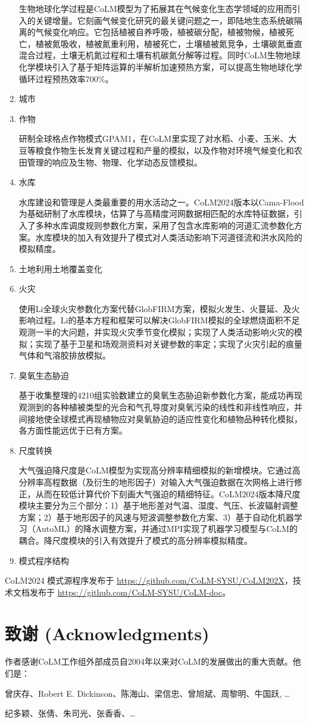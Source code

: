 \begin{enumerate}[label={\arabic*)}]
    生物地球化学过程是CoLM模型为了拓展其在气候变化生态学领域的应用而引入的关键增量。它刻画气候变化研究的最关键问题之一，即陆地生态系统碳隔离的气候变化响应。它包括植被自养呼吸，植被碳分配，植被物候，植被死亡，植被氮吸收，植被氮重利用，植被死亡，土壤植被氮竞争，土壤碳氮垂直混合过程，土壤无机氮过程和土壤有机碳氮分解等过程。同时CoLM生物地球化学模块引入了基于矩阵运算的半解析加速预热方案，可以提高生物地球化学循环过程预热效率700\%。

    \item 城市
    \item 作物 

    研制全球格点作物模式GPAM1，在CoLM里实现了对水稻、小麦、玉米、大豆等粮食作物生长发育关键过程和产量的模拟，以及作物对环境气候变化和农田管理的响应及生物、物理、化学动态反馈模拟。
    
    \item 水库

    水库建设和管理是人类最重要的用水活动之一。CoLM2024版本以Cama-Flood为基础研制了水库模块，估算了与高精度河网数据相匹配的水库特征数据，引入了多种水库调度规则参数化方案，采用了包含水库影响的河道汇流参数化方案。水库模块的加入有效提升了模式对人类活动影响下河道径流和洪水风险的模拟精度。
    
    \item 土地利用土地覆盖变化 
    \item 火灾

    使用Li全球火灾参数化方案代替GlobFIRM方案，模拟火发生、火蔓延、及火影响过程。Li的基本方程和框架可以解决GlobFIRM模拟的全球燃烧面积不足观测一半的大问题，并实现火灾季节变化模拟；实现了人类活动影响火灾的模拟；实现了基于卫星和场观测资料对关键参数的率定；实现了火灾引起的痕量气体和气溶胶排放模拟。

    \item 臭氧生态胁迫

    基于收集整理的4210组实验数建立的臭氧生态胁迫新参数化方案，能成功再现观测到的各种植被类型的光合和气孔导度对臭氧污染的线性和非线性响应，并间接地使全球模式再现植物应对臭氧胁迫的适应性变化和植物品种转化模拟，各方面性能远优于已有方案。
    
    \item 尺度转换

    大气强迫降尺度是CoLM模型为实现高分辨率精细模拟的新增模块。它通过高分辨率高程数据（及衍生的地形因子）对输入大气强迫数据在次网格上进行修正，从而在较低计算代价下刻画大气强迫的精细特征。CoLM2024版本降尺度模块主要分为三个部分：1）基于地形差对气温、湿度、气压、长波辐射调整方案；2）基于地形因子的风速与短波调整参数化方案、3）基于自动化机器学习（AutoML）的降水调整方案，并通过MPI实现了机器学习模型与CoLM的耦合。降尺度模块的引入有效提升了模式的高分辨率模拟精度。
    
    \item 模式程序结构
\end{enumerate}

CoLM2024 模式源程序发布于 \url{https://github.com/CoLM-SYSU/CoLM202X}，技术文档发布于 \url{https://github.com/CoLM-SYSU/CoLM-doc}。


\section{致谢 (Acknowledgments)}
作者感谢CoLM工作组外部成员自2004年以来对CoLM的发展做出的重大贡献。他们是：

曾庆存、Robert E. Dickinson、陈海山、梁信忠、曾旭斌、周黎明、牛国跃, …

纪多颖、张倩、朱司光、张香香、…
